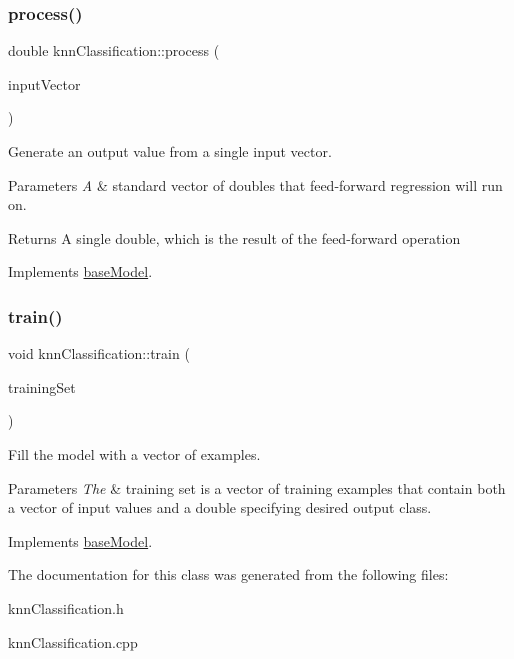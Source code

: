 \subsubsection{\texorpdfstring{process()}{process()}}
{\footnotesize\ttfamily double knn\+Classification\+::process (\begin{DoxyParamCaption}\item[{std\+::vector$<$ double $>$}]{input\+Vector }\end{DoxyParamCaption})\hspace{0.3cm}{\ttfamily [virtual]}}

Generate an output value from a single input vector. 
\begin{DoxyParams}{Parameters}
{\em A} & standard vector of doubles that feed-\/forward regression will run on. \\
\hline
\end{DoxyParams}
\begin{DoxyReturn}{Returns}
A single double, which is the result of the feed-\/forward operation 
\end{DoxyReturn}


Implements \hyperlink{classbase_model}{base\+Model}.

\mbox{\label{classknn_classification_ae159e53f542d08d04c76760f2e25e843}} 
\subsubsection{\texorpdfstring{train()}{train()}}
{\footnotesize\ttfamily void knn\+Classification\+::train (\begin{DoxyParamCaption}\item[{std\+::vector$<$ \hyperlink{structtraining_example}{training\+Example} $>$}]{training\+Set }\end{DoxyParamCaption})\hspace{0.3cm}{\ttfamily [virtual]}}

Fill the model with a vector of examples.


\begin{DoxyParams}{Parameters}
{\em The} & training set is a vector of training examples that contain both a vector of input values and a double specifying desired output class. \\
\hline
\end{DoxyParams}


Implements \hyperlink{classbase_model}{base\+Model}.



The documentation for this class was generated from the following files\+:\begin{DoxyCompactItemize}
\item 
knn\+Classification.\+h\item 
knn\+Classification.\+cpp\end{DoxyCompactItemize}
